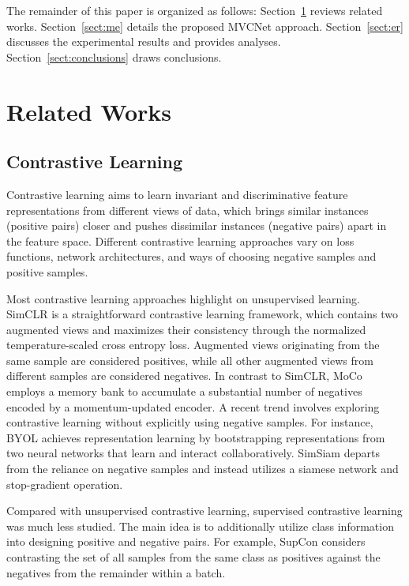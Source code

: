 \documentclass[journal]{IEEEtran}
\begin{document}
The remainder of this paper is organized as follows: Section~\ref{sect:rw} reviews related works. Section~\ref{sect:me} details the proposed MVCNet approach. Section~\ref{sect:er} discusses the experimental results and provides analyses. Section~\ref{sect:conclusions} draws conclusions.

\section{Related Works}\label{sect:rw}
\subsection{Contrastive Learning}
Contrastive learning aims to learn invariant and discriminative feature representations from different views of data, which brings similar instances (positive pairs) closer and pushes dissimilar instances (negative pairs) apart in the feature space. Different contrastive learning approaches vary on loss functions, network architectures, and ways of choosing negative samples and positive samples. 

Most contrastive learning approaches highlight on unsupervised learning. SimCLR \cite{simclr2020} is a straightforward contrastive learning framework, which contains two augmented views and maximizes their consistency through the normalized temperature-scaled cross entropy loss. Augmented views originating from the same sample are considered positives, while all other augmented views from different samples are considered negatives. In contrast to SimCLR, MoCo \cite{he2020moco} employs a memory bank to accumulate a substantial number of negatives encoded by a momentum-updated encoder. A recent trend involves exploring contrastive learning without explicitly using negative samples. For instance, BYOL \cite{grill2020BYOL} achieves representation learning by bootstrapping representations from two neural networks that learn and interact collaboratively. SimSiam \cite{chen2021simsiam} departs from the reliance on negative samples and instead utilizes a siamese network and stop-gradient operation.

Compared with unsupervised contrastive learning, supervised contrastive learning was much less studied. The main idea is to additionally utilize class information into designing positive and negative pairs. For example, SupCon \cite{Khosla2020} considers contrasting the set of all samples from the same class as positives against the negatives from the remainder within a batch.
\end{document}
